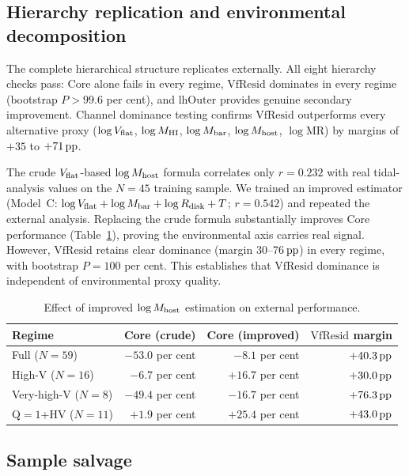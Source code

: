 \documentclass[fleqn,usenatbib]{mnras}
\newcommand{\vflat}{V_{\rm flat}}
\newcommand{\vfresid}{\mathrm{VfResid}}
\newcommand{\lhOuter}{\mathrm{lhOuter}}
\newcommand{\mhi}{M_{\rm HI}}
\newcommand{\mbar}{M_{\rm bar}}
\newcommand{\mhost}{M_{\rm host}}
\newcommand{\rdisk}{R_{\rm disk}}
\newcommand{\pp}{{\rm pp}}
\begin{document}
\subsection{Hierarchy replication and environmental decomposition}
\label{sec:hierarchy}

The complete hierarchical structure replicates externally. All eight
hierarchy checks pass: Core alone fails in every regime, $\vfresid$
dominates in every regime (bootstrap $P > 99.6$ per cent), and $\lhOuter$
provides genuine secondary improvement. Channel dominance testing confirms
$\vfresid$ outperforms every alternative proxy ($\log \vflat$,
$\log \mhi$, $\log \mbar$, $\log \mhost$, $\log$MR) by margins of
$+35$ to $+71\,\pp$.

The crude $\vflat$-based $\log \mhost$ formula correlates only $r = 0.232$
with real tidal-analysis values on the $N = 45$ training sample.
We trained an improved estimator (Model~C: $\log \vflat + \log \mbar +
\log \rdisk + T$; $r = 0.542$) and repeated the external analysis.
Replacing the crude formula substantially improves Core performance
(Table~\ref{tab:mhost}), proving the environmental axis carries real
signal. However, $\vfresid$ retains clear dominance (margin 30--76$\,\pp$)
in every regime, with bootstrap $P = 100$ per cent. This establishes that
$\vfresid$ dominance is independent of environmental proxy quality.

\begin{table}
\centering
\caption{Effect of improved $\log \mhost$ estimation on external performance.}
\label{tab:mhost}
\begin{tabular}{@{}lrrr@{}}
\hline
Regime & Core (crude) & Core (improved) & $\vfresid$ margin \\
\hline
Full ($N=59$) & $-53.0$ per cent & $-8.1$ per cent & $+40.3\,\pp$ \\
High-V ($N=16$) & $-6.7$ per cent & $+16.7$ per cent & $+30.0\,\pp$ \\
Very-high-V ($N=8$) & $-49.4$ per cent & $-16.7$ per cent & $+76.3\,\pp$ \\
Q$=1$+HV ($N=11$) & $+1.9$ per cent & $+25.4$ per cent & $+43.0\,\pp$ \\
\hline
\end{tabular}
\end{table}

\subsection{Sample salvage}
\label{sec:salvage}
\end{document}
